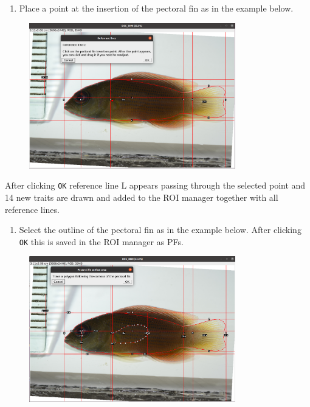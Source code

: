 \documentclass[
  letterpaper,
]{scrbook}
\providecommand{\tightlist}{%
  \setlength{\itemsep}{0pt}\setlength{\parskip}{0pt}}\usepackage{longtable,booktabs,array}
\begin{document}
\begin{enumerate}
\def\labelenumi{\arabic{enumi}.}
\setcounter{enumi}{8}
\tightlist
\item
  Place a point at the insertion of the pectoral fin as in the example
  below.
\end{enumerate}

\begin{figure}

{\centering \includegraphics[width=0.8\textwidth,height=\textheight]{./images/screenshots/pectoral_fin_insertion.png}

}

\end{figure}

After clicking \texttt{OK} reference line L appears passing through the
selected point and 14 new traits are drawn and added to the ROI manager
together with all reference lines.

\begin{enumerate}
\def\labelenumi{\arabic{enumi}.}
\setcounter{enumi}{9}
\tightlist
\item
  Select the outline of the pectoral fin as in the example below. After
  clicking \texttt{OK} this is saved in the ROI manager as PFs.
\end{enumerate}

\begin{figure}

{\centering \includegraphics[width=0.8\textwidth,height=\textheight]{./images/screenshots/pectoral_fin_outline.png}

}

\end{figure}
\end{document}
